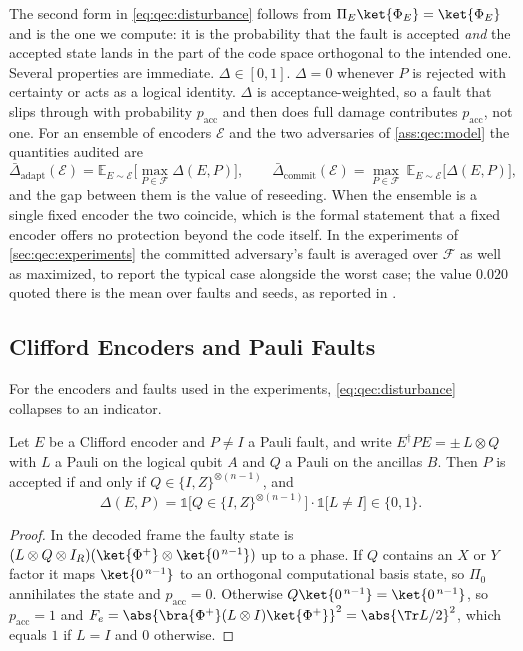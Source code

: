 The second form in \cref{eq:qec:disturbance} follows from $\Pi_E\ket{\Phi_E}=\ket{\Phi_E}$ and is the one we compute: it is the probability that the fault is accepted \emph{and} the accepted state lands in the part of the code space orthogonal to the intended one. Several properties are immediate. $\Delta\in[0,1]$. $\Delta=0$ whenever $P$ is rejected with certainty or acts as a logical identity. $\Delta$ is acceptance-weighted, so a fault that slips through with probability $p_{\mathrm{acc}}$ and then does full damage contributes $p_{\mathrm{acc}}$, not one. For an ensemble of encoders $\mathcal{E}$ and the two adversaries of \cref{ass:qec:model} the quantities audited are
\begin{equation}\label{eq:qec:adversaries}
  \bar\Delta_{\mathrm{adapt}}(\mathcal{E})=\mathbb{E}_{E\sim\mathcal{E}}\Big[\max_{P\in\mathcal{F}}\Delta(E,P)\Big],\qquad
  \bar\Delta_{\mathrm{commit}}(\mathcal{E})=\max_{P\in\mathcal{F}}\ \mathbb{E}_{E\sim\mathcal{E}}\big[\Delta(E,P)\big],
\end{equation}
and the gap between them is the value of reseeding. When the ensemble is a single fixed encoder the two coincide, which is the formal statement that a fixed encoder offers no protection beyond the code itself. In the experiments of \cref{sec:qec:experiments} the committed adversary's fault is averaged over $\mathcal{F}$ as well as maximized, to report the typical case alongside the worst case; the value $0.020$ quoted there is the mean over faults and seeds, as reported in \cite{guo2026qecaudit}.

\subsection{Clifford Encoders and Pauli Faults}\label{sec:qec:cliffordcase}

For the encoders and faults used in the experiments, \cref{eq:qec:disturbance} collapses to an indicator.

\begin{lemma}\label{lem:qec:indicator}
Let $E$ be a Clifford encoder and $P\neq I$ a Pauli fault, and write $E^{\dagger}PE=\pm\,L\otimes Q$ with $L$ a Pauli on the logical qubit $A$ and $Q$ a Pauli on the ancillas $B$. Then $P$ is accepted if and only if $Q\in\{I,Z\}^{\otimes(n-1)}$, and
\begin{equation}\label{eq:qec:indicator}
  \Delta(E,P)=\mathbb{1}\big[Q\in\{I,Z\}^{\otimes(n-1)}\big]\cdot\mathbb{1}\big[L\neq I\big]\in\{0,1\}.
\end{equation}
\end{lemma}
\begin{proof}
In the decoded frame the faulty state is $(L\otimes Q\otimes I_R)(\ket{\Phi^{+}}\otimes\ket{0^{\,n-1}})$ up to a phase. If $Q$ contains an $X$ or $Y$ factor it maps $\ket{0^{\,n-1}}$ to an orthogonal computational basis state, so $\Pi_0$ annihilates the state and $p_{\mathrm{acc}}=0$. Otherwise $Q\ket{0^{\,n-1}}=\ket{0^{\,n-1}}$, so $p_{\mathrm{acc}}=1$ and $F_e=\abs{\bra{\Phi^{+}}(L\otimes I)\ket{\Phi^{+}}}^{2}=\abs{\Tr L/2}^{2}$, which equals $1$ if $L=I$ and $0$ otherwise.
\end{proof}

